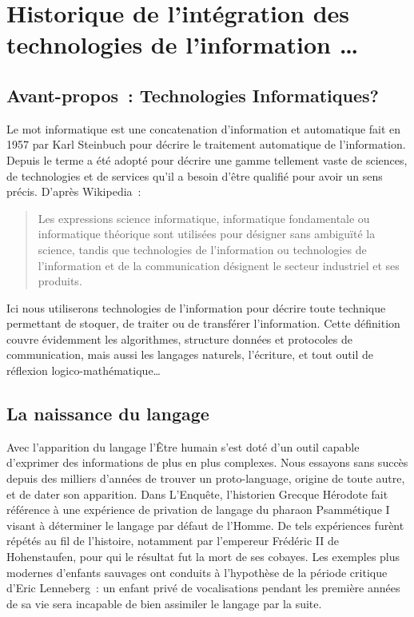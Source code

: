 
\chapter{Historique de l'intégration des technologies de l'information \ldots}\label{quoi}

\section*{Avant-propos~: Technologies \og{}Informatiques\fg{}?}
Le mot \og{}informatique\fg{} est une concatenation d'\og{}information\fg{} et \og{}automatique\fg{} fait en 1957 par Karl Steinbuch\cite{steinbuch-2005} pour décrire le traitement automatique de l'information. 
Depuis le terme a été adopté pour décrire une gamme tellement vaste de sciences, de technologies et de services qu'il a besoin d'être qualifié pour avoir un sens précis. D'après Wikipedia\cite{wiki-informatique}~:
\begin{quote}
Les expressions \og{}science informatique\fg{}, \og{}informatique fondamentale\fg{} ou \og{}informatique théorique\fg{} sont utilisées pour désigner sans ambiguïté la science, tandis que \og{}technologies de l'information\fg{} ou \og{}technologies de l'information et de la communication\fg{} désignent le secteur industriel et ses produits.
\end{quote}
Ici nous utiliserons \og{}technologies de l'information\fg{} pour décrire toute technique permettant de stoquer, de traiter ou de transférer l'information. Cette définition couvre évidemment les algorithmes, structure données et protocoles de communication, mais aussi les langages naturels, l'écriture, et tout outil de réflexion logico-mathématique\ldots

\section{La naissance du langage}
Avec l'apparition du langage l'Être humain s'est doté d'un outil capable d'exprimer des informations de plus en plus complexes. Nous essayons sans succès depuis des milliers d'années de trouver un \og{}proto-language\fg{}, origine de toute autre, et de dater son apparition. Dans \og{}L'Enquête\fg{}, l'historien Grecque Hérodote fait référence à une expérience de \og{}privation de langage\fg{} du pharaon Psammétique I visant à déterminer le langage \og{}par défaut\fg{} de l'Homme\cite{herodote-privation}. De tels expériences furènt répétés au fil de l'histoire, notamment par l'empereur Frédéric II de Hohenstaufen, pour qui le résultat fut la mort de ses \og{}cobayes\fg{}\cite{ggcoulton-francis-to-dante}. Les exemples plus modernes d'enfants \og{}sauvages\fg{} ont conduits à l'hypothèse de la \og{}période critique\fg{} d'Eric Lenneberg\cite{lenneberg-crit-period}~: un enfant privé de vocalisations pendant les première années de sa vie sera incapable de bien assimiler le langage par la suite.

